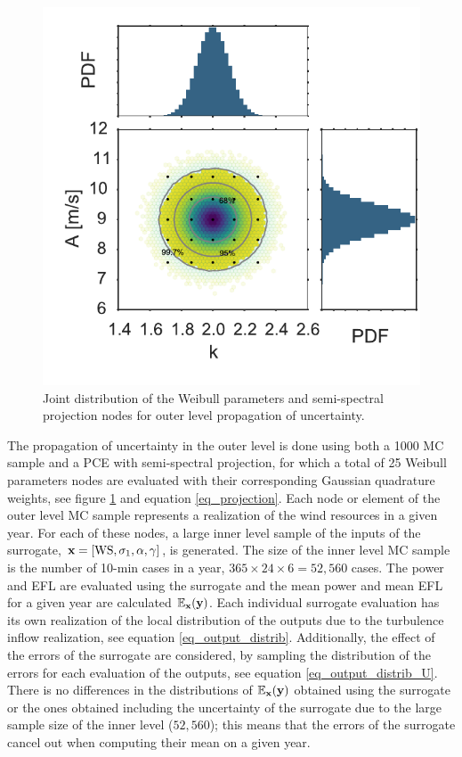 \documentclass[preprint,12pt]{elsarticle}
\begin{document}
\begin{multicols}{2}
\begin{figure}[H]
\begin{centering}
\includegraphics[width=0.6\linewidth]{Figures/U_AEP/Resources_PCE.pdf}
\caption{Joint distribution of the Weibull parameters and semi-spectral projection nodes for outer level propagation of uncertainty.}
\label{fig_outer_PCE}
\end{centering}
\end{figure}
\end{multicols}

The propagation of uncertainty in the outer level is done using both a 1000 MC sample and a PCE with semi-spectral projection, for which a total of 25 Weibull parameters nodes are evaluated with their corresponding Gaussian quadrature weights, see figure \ref{fig_outer_PCE} and equation \ref{eq_projection}. Each node or element of the outer level MC sample represents a realization of the wind resources in a given year. For each of these nodes, a large inner level sample of the inputs of the surrogate, $\mathbf{x}=[\text{WS}, \sigma_{1}, \alpha, \gamma]$, is generated. The size of the inner level MC sample is the number of 10-min cases in a year, $365\times24\times6=52,560$ cases. The power and EFL are evaluated using the surrogate and the mean power and mean EFL for a given year are calculated $\mathbb{E}_{\mathbf{x}}(\mathbf{y})$. Each individual surrogate evaluation has its own realization of the local distribution of the outputs due to the turbulence inflow realization, see equation \ref{eq_output_distrib}. Additionally, the effect of the errors of the surrogate are considered, by sampling the distribution of the errors for each evaluation of the outputs, see equation \ref{eq_output_distrib_U}. There is no differences in the distributions of  $\mathbb{E}_{\mathbf{x}}(\mathbf{y})$ obtained using the surrogate or the ones obtained including the uncertainty of the surrogate due to the large sample size of the inner level ($52,560$); this means that the errors of the surrogate cancel out when computing their mean on a given year. 
\end{document}
